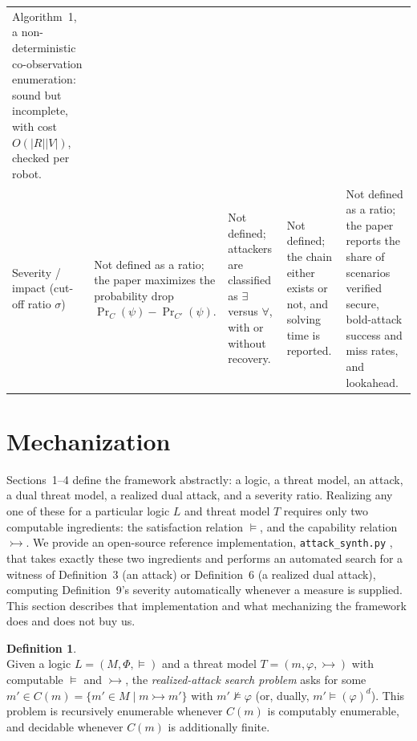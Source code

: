 \documentclass[11pt]{amsart}
\theoremstyle{definition}
\newtheorem{definition}{Definition}
\theoremstyle{remark}
\newcommand{\nsat}{\not\models}
\newcommand{\adv}{\rightarrowtail}   %
\begin{document}
\begin{landscape}
\begin{longtable}{L{3.0cm} L{4.6cm} L{4.6cm} L{4.6cm} L{4.6cm}}
Algorithm~1, a non-deterministic co-observation enumeration: sound but incomplete, with cost $O(|R||V|)$, checked per robot. \\
\addlinespace
Severity / impact (cut-off ratio $\sigma$) &
Not defined as a ratio; the paper maximizes the probability drop $\Pr_C(\psi) - \Pr_{C'}(\psi)$. &
Not defined; attackers are classified as $\exists$ versus $\forall$, with or without recovery. &
Not defined; the chain either exists or not, and solving time is reported. &
Not defined as a ratio; the paper reports the share of scenarios verified secure, bold-attack success and miss rates, and lookahead. \\
\bottomrule
\end{longtable}
\endgroup
\end{landscape}

\section{Mechanization}

Sections~1--4 define the framework abstractly: a logic, a threat model, an attack, a dual threat
model, a realized dual attack, and a severity ratio. Realizing any one of these for a particular
logic $L$ and threat model $T$ requires only two computable ingredients: the satisfaction relation
$\models$, and the capability relation $\adv$. We provide an open-source reference implementation,
\texttt{attack\_synth.py} \cite{attacksynth}, that takes exactly these two ingredients and performs
an automated search for a witness of Definition~3 (an attack) or Definition~6 (a realized dual
attack), computing Definition~9's severity automatically whenever a measure is supplied. This
section describes that implementation and what mechanizing the framework does and does not buy us.

\begin{definition}
\leavevmode\\
Given a logic $L = (M, \Phi, \models)$ and a threat model $T = (m, \varphi, \adv)$ with computable
$\models$ and $\adv$, the \emph{realized-attack search problem} asks for some $m' \in C(m) =
\{m' \in M \mid m \adv m'\}$ with $m' \nsat \varphi$ (or, dually, $m' \models (\varphi)^{d}$). This
problem is recursively enumerable whenever $C(m)$ is computably enumerable, and decidable whenever
$C(m)$ is additionally finite.
\end{definition}
\end{document}
